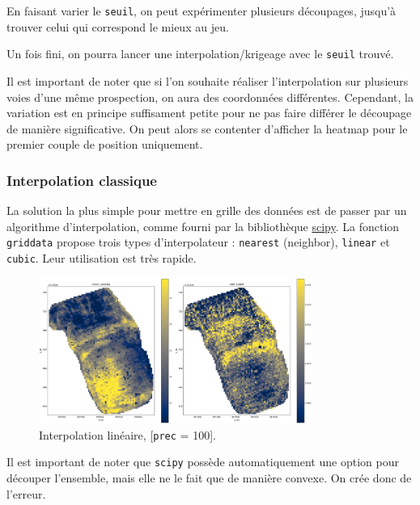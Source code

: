 \documentclass[12pt]{article}
\begin{document}
    En faisant varier le \texttt{seuil}, on peut expérimenter plusieurs découpages, jusqu'à trouver celui qui correspond le mieux au jeu.

    Un fois fini, on pourra lancer une interpolation/krigeage avec le \texttt{seuil} trouvé.

    Il est important de noter que si l'on souhaite réaliser l'interpolation sur plusieurs voies d'une même prospection, on aura des coordonnées différentes. Cependant, la variation est en principe suffisament petite pour ne pas faire différer le découpage de manière significative. On peut alors se contenter d'afficher la heatmap pour le premier couple de position uniquement.

\newpage
\subsubsection{Interpolation classique}

    La solution la plus simple pour mettre en grille des données est de passer par un algorithme d'interpolation, comme fourni par la bibliothèque \href{https://docs.scipy.org/doc/scipy/reference/generated/scipy.interpolate.griddata.html}{scipy}. La fonction \texttt{griddata} propose trois types d'interpolateur : \texttt{nearest} (neighbor), \texttt{linear} et \texttt{cubic}. Leur utilisation est très rapide.

    \begin{figure}[ht!]
        \centering
        \includegraphics[width=0.8\textwidth]{Images/Grid_Interplin_r1c1p100.png}
        \caption{Interpolation linéaire, [\texttt{prec} = 100].}
    \end{figure}

    Il est important de noter que \texttt{scipy} possède automatiquement une option pour découper l'ensemble, mais elle ne le fait que de manière convexe. On crée donc de l'erreur.
\end{document}
